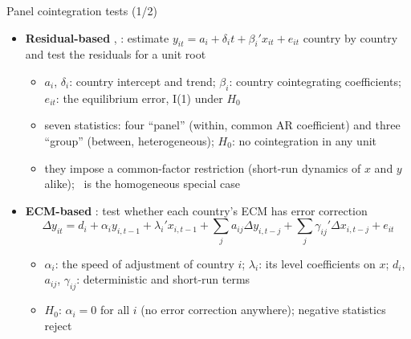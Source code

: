 \begin{frame}{Panel cointegration tests (1/2)}
\itemsize{\small}
\begin{itemize}
    \item \textbf{Residual-based} , : estimate $y_{it} = a_i + \delta_it + \beta_i'x_{it} + e_{it}$ country by country and test the residuals for a unit root
    \begin{itemize}
        \item $a_i$, $\delta_i$: country intercept and trend; $\beta_i$: country cointegrating coefficients; $e_{it}$: the equilibrium error, I(1) under $H_0$
        \item seven statistics: four ``panel'' (within, common AR coefficient) and three ``group'' (between, heterogeneous); $H_0$: no cointegration in any unit
        \item they impose a common-factor restriction (short-run dynamics of $x$ and $y$ alike); \ is the homogeneous special case
    \end{itemize}
    \item \textbf{ECM-based} : test whether each country's ECM has error correction \[ \Delta y_{it} = d_i + \alpha_iy_{i,t-1} + \lambda_i'x_{i,t-1} + \sum_j a_{ij}\Delta y_{i,t-j} + \sum_j\gamma_{ij}'\Delta x_{i,t-j} + e_{it} \]
    \begin{itemize}
        \item $\alpha_i$: the speed of adjustment of country $i$; $\lambda_i$: its level coefficients on $x$; $d_i$, $a_{ij}$, $\gamma_{ij}$: deterministic and short-run terms
        \item $H_0$: $\alpha_i = 0$ for all $i$ (no error correction anywhere); negative statistics reject
    \end{itemize}
\end{itemize}
\end{frame}

